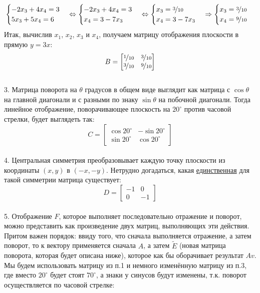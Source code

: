 \documentclass[a3paper,14pt]{extarticle}
\begin{document}
$$\begin{cases}
    -2x_3+4x_4 = 3 \\ 5x_3+5x_4 = 6
\end{cases} \Leftrightarrow \begin{cases}
    -2x_3+4x_4 = 3 \\ x_4 = 3-7x_3
\end{cases} \Leftrightarrow \begin{cases}
    x_3 = \nicefrac{3}{10} \\ x_4 = 3-7x_3
\end{cases} \Rightarrow \begin{cases}
    x_3 = \nicefrac{3}{10} \\ x_4 = \nicefrac{9}{10}
\end{cases}$$
Итак, вычислив $x_1$, $x_2$, $x_3$ и $x_4$, получаем матрицу отображения плоскости в прямую $y=3x$:
$$B=\begin{bmatrix}
    \nicefrac{1}{10} & \nicefrac{3}{10} \\ \nicefrac{3}{10} & \nicefrac{9}{10}
\end{bmatrix}$$\,\\[0.5em]
3. Матрица поворота на $\theta$ градусов в общем виде выглядит как матрица с $\cos\theta$ на главной диагонали и с разными по знаку $\sin\theta$ на побочной диагонали. Тогда линейное отображение, поворачивающее плоскость на $20^\circ$ против часовой стрелки, будет выглядеть так:
$$C = \begin{bmatrix}
    \cos20^\circ & -\sin20^\circ \\ \sin20^\circ & \cos20^\circ
\end{bmatrix}$$\,\\[0.5em]
4. Центральная симметрия преобразовывает каждую точку плоскости из координаты $(x, y)$ в $(-x, -y)$. Нетрудно догадаться, какая \underline{единственная} для такой симметрии матрица существует:
$$D = \begin{bmatrix}
    -1 & 0 \\ 0 & -1
\end{bmatrix}$$\,\\[0.5em]
5. Отображение $F$, которое выполняет последовательно отражение и поворот, можно представить как произведение двух матриц, выполняющих эти действия. Притом важен порядок: ввиду того, что сначала выполняется отражение, а затем поворот, то к вектору применяется сначала $A$, а затем $\tilde{E}$ (новая матрица поворота, которая будет описана ниже), которое как бы оборачивает результат $Av$. Мы будем использовать матрицу из п.1 и немного изменённую матрицу из п.3, где вместо $20^\circ$ будет стоят $70^\circ$, а знаки у синусов будут изменены, т.к. поворот осуществляется по часовой стрелке:
\end{document}

